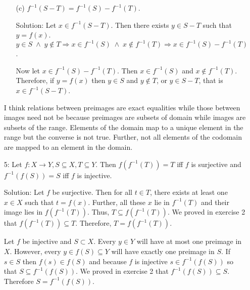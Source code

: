 \begin{enumerate}
\begin{enumerate}
\item[(c)] $f^{-1}(S - T) = f^{-1}(S) - f^{-1}(T)$.
\item[Solution:] Let $x \in f^{-1}(S - T)$. Then there exists $y \in S - T$
such that $y = f(x)$. $y \in S \;\land\; y \notin T \Rightarrow x \in
f^{-1}(S) \;\land\; x \notin f^{-1}(T) \Rightarrow x \in f^{-1}(S) - 
f^{-1}(T)$.

Now let $x \in f^{-1}(S) - f^{-1}(T)$. Then $x \in f^{-1}(S)$ and $x \notin
f^{-1}(T)$. Therefore, if $y = f(x)$ then $y \in S$ and $y \notin T$, or
$y \in S - T$, that is $x \in f^{-1}(S - T)$.
\end{enumerate}
I think relations between preimages are exact equalities while those 
between images need not be because preimages are subsets of domain while 
images are subsets of the range. Elements of the domain map to a unique 
element in the range but the converse is not true. Further, not all 
elements of the codomain are mapped to an element in the domain.

\item[5:] Let $f: X \rightarrow Y, S \subseteq X, T \subseteq Y$. Then
$f(f^{-1}(T)) = T$ iff $f$ is surjective and $f^{-1}(f(S)) = S$ iff $f$
is injective.
\item[Solution:] Let $f$ be surjective. Then for all $t \in T$, there 
exists at least one $x \in X$ such that $t = f(x)$. Further, all these
$x$ lie in $f^{-1}(T)$ and their image lies in $f(f^{-1}(T))$. Thus, $T
\subseteq f(f^{-1}(T))$. We proved in exercise 2 that $f(f^{-1}(T)) 
\subseteq T$. Therefore, $T = f(f^{-1}(T))$.

Let $f$ be injective and $S \subset X$. Every $y \in Y$ will have at most
one preimage in $X$. However, every $y \in f(S) \subseteq Y$ will have
exactly one preimage in $S$. If $s \in S$ then $f(s) \in f(S)$ and 
because $f$ is injective $s \in f^{-1}(f(S))$ so that $S \subseteq 
f^{-1}(f(S))$. We proved in exercise 2 that $f^{-1}(f(S)) \subseteq S$.
Therefore $S = f^{-1}(f(S))$.
\end{enumerate}

